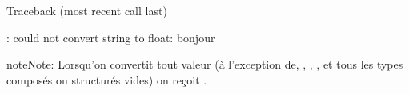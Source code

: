\documentclass[letterpaper,10pt,french]{sphinxmanual}
\begin{document}
\begin{sphinxVerbatim}[commandchars=\\\{\}]
  
\end{sphinxVerbatim}

\begin{sphinxVerbatim}[commandchars=\\\{\}]
Traceback (most recent call last)
\PYGZbs{}\PYGZbs{}\PYGZbs{}\PYGZbs{}\PYGZbs{}  
   
 

: could not convert string to float: \PYGZsq{}bonjour\PYGZsq{}
\end{sphinxVerbatim}

\begin{sphinxadmonition}{note}{Note:}
\sphinxAtStartPar
Lorsqu’on convertit tout valeur (à l’exception de, \sphinxcode{\sphinxupquote{\textquotesingle{}\textquotesingle{}}}, , \sphinxcode{\sphinxupquote{{[}{]}}}, et tous les types composés ou structurés vides) on reçoit .
\end{sphinxadmonition}
\end{document}
